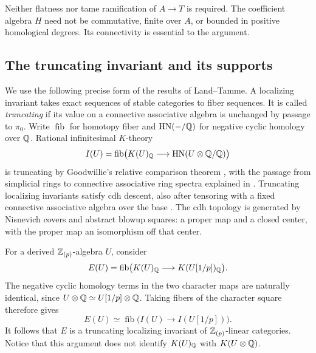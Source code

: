 Neither flatness nor tame ramification of $A\to T$ is required.
The coefficient algebra $H$ need not be commutative, finite over $A$,
or bounded in positive homological degrees. Its connectivity is
essential to the argument.

\subsection{The truncating invariant and its supports}

We use the following precise form of the results of Land--Tamme.
A localizing invariant takes exact sequences of stable categories to
fiber sequences. It is called \emph{truncating} if its value on a
connective associative algebra is unchanged by passage to $\pi_0$.
Write $\operatorname{fib}$ for homotopy fiber and
$\operatorname{HN}(-/\mathbb{Q})$ for negative cyclic homology over $\mathbb{Q}$.
Rational infinitesimal $K$-theory
\[
 I(U)=\operatorname{fib}\bigl(
   K(U)_{\mathbb{Q}}\longrightarrow
   \operatorname{HN}(U\otimes\mathbb{Q}/\mathbb{Q})\bigr)
\]
is truncating by Goodwillie's relative comparison theorem
\cite[Main Theorem]{Goodwillie}, with the passage from simplicial rings
to connective associative ring spectra explained in
\cite[proof of Corollary~3.9 and Remark~3.10]{LT}. Truncating localizing
invariants satisfy cdh descent, also after tensoring with a fixed
connective associative algebra over the base
\cite[Theorem~A.2 and Appendix~B, especially Theorem~B.3]{LT}.
The cdh topology is generated by Nisnevich covers and abstract blowup
squares: a proper map and a closed center, with the proper map an
isomorphism off that center.

For a derived $\mathbb{Z}_{(p)}$-algebra $U$, consider
\begin{equation}
 E(U)=\operatorname{fib}\bigl(
      K(U)_{\mathbb{Q}}\longrightarrow K(U[1/p])_{\mathbb{Q}}\bigr).
 \label{ds:relative-invariant}
\end{equation}
The negative cyclic homology terms in the two character maps are
naturally identical, since
$U\otimes\mathbb{Q}\simeq U[1/p]\otimes\mathbb{Q}$. Taking fibers of the character
square therefore gives
\begin{equation}
 E(U)\simeq\operatorname{fib}\bigl(I(U)\longrightarrow I(U[1/p])\bigr).
 \label{ds:character-cancellation}
\end{equation}
It follows that $E$ is a truncating localizing invariant of
$\mathbb{Z}_{(p)}$-linear categories. Notice that this argument does not
identify $K(U)_{\mathbb{Q}}$ with $K(U\otimes\mathbb{Q})$.

